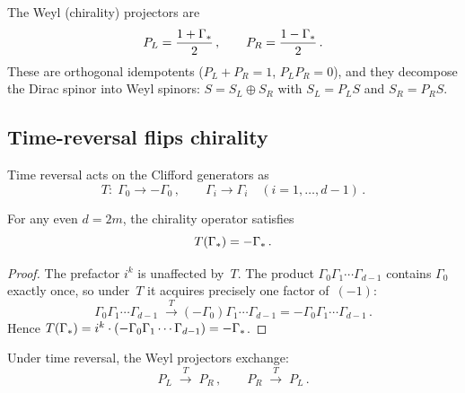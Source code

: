 The Weyl (chirality) projectors are
\begin{equation}\label{eq:weyl-proj}
  P_L = \frac{1 + \Gamma_*}{2}\,,
  \qquad
  P_R = \frac{1 - \Gamma_*}{2}\,.
\end{equation}
These are orthogonal idempotents ($P_L + P_R = 1$, $P_L P_R = 0$),
and they decompose the Dirac spinor into Weyl spinors:
$S = S_L \oplus S_R$ with $S_L = P_L S$ and $S_R = P_R S$.

\subsection{Time-reversal flips chirality}
\label{sec:time-reversal}

Time reversal acts on the Clifford generators as
\begin{equation}\label{eq:time-reversal}
  T\colon\; \Gamma_0 \to -\Gamma_0\,,
  \qquad
  \Gamma_i \to \Gamma_i \quad (i = 1,\ldots,d{-}1)\,.
\end{equation}

\begin{proposition}\label{prop:chirality-flip}
For any even $d = 2m$, the chirality operator satisfies
\begin{equation}\label{eq:chirality-flip}
  T(\Gamma_*) = -\Gamma_*\,.
\end{equation}
\end{proposition}

\begin{proof}
The prefactor $i^k$ is unaffected by~$T$.  The product
$\Gamma_0\Gamma_1\cdots\Gamma_{d-1}$ contains $\Gamma_0$ exactly
once, so under~$T$ it acquires precisely one factor of~$(-1)$:
\begin{equation*}
  \Gamma_0\Gamma_1\cdots\Gamma_{d-1}
  \;\xrightarrow{\;T\;}
  (-\Gamma_0)\Gamma_1\cdots\Gamma_{d-1}
  = -\Gamma_0\Gamma_1\cdots\Gamma_{d-1}\,.
\end{equation*}
Hence $T(\Gamma_*) = i^k\cdot(-\Gamma_0\Gamma_1
\cdots\Gamma_{d-1}) = -\Gamma_*$.
\end{proof}

\begin{corollary}\label{cor:projector-exchange}
Under time reversal, the Weyl projectors exchange:
\begin{equation}\label{eq:projector-exchange}
  P_L \;\xrightarrow{\;T\;}\; P_R\,,
  \qquad
  P_R \;\xrightarrow{\;T\;}\; P_L\,.
\end{equation}
\end{corollary}

